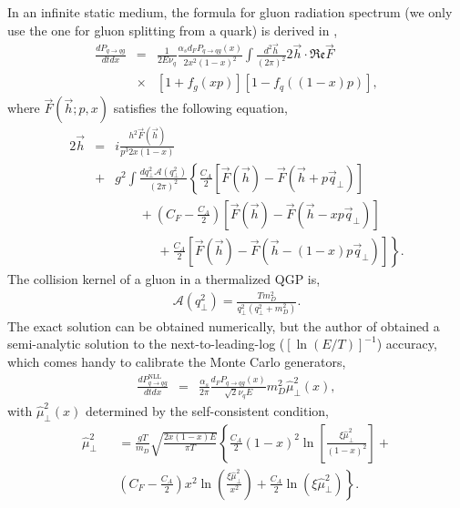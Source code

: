 \documentclass[aps, prc, reprint, amsmath, groupedaddress, nofootinbib]{revtex4-1}
\begin{document}
In an infinite static medium, the formula for gluon radiation spectrum (we only use the one for gluon splitting from a quark) is derived in \cite{Arnold:2002zm,Arnold:2003zc},
\begin{eqnarray}\label{eq:AMY-1}
\nonumber
\frac{dP_{q\rightarrow qg}}{dt dx} &=& \frac{1}{2E\nu_q} \frac{\alpha_s d_F P_{q\rightarrow qg}(x)}{2x^2(1-x)^2}\int\frac{d^2\vec{h}}{(2\pi)^2}2\vec{h}\cdot \mathfrak{Re} \vec{F} \\
&\times& [1+f_g(xp)][1-f_q((1-x)p)],
\end{eqnarray}
where $\vec{F}(\vec{h}; p, x)$ satisfies the following equation,
\begin{eqnarray}\label{eq:AMY-2}
\nonumber
2\vec{h} &=& i\frac{h^2 \vec{F}(\vec{h})}{p^3 2x(1-x)} \\
\nonumber
&+& g^2\int \frac{dq_\perp^2 \mathcal{A}(q_\perp^2)}{(2\pi)^2}\left\{\frac{C_A}{2}\left[\vec{F}(\vec{h}) - \vec{F}(\vec{h}+p\vec{q}_\perp)\right]\right. \\
\nonumber
&& \phantom{ssss} + \left(C_F - \frac{C_A}{2}\right)\left[\vec{F}(\vec{h}) - \vec{F}(\vec{h}-xp\vec{q}_\perp)\right] \\
&& \phantom{sssssss} + \left. \frac{C_A}{2}\left[\vec{F}(\vec{h}) - \vec{F}(\vec{h}-(1-x)p\vec{q}_\perp)\right] \right\}.
\end{eqnarray}
The collision kernel of a gluon in a thermalized QGP is,
\begin{eqnarray}
\mathcal{A}(q_\perp^2) = \frac{T m_D^2}{q_\perp^2(q_\perp^2+m_D^2)}.
\end{eqnarray}
The exact solution can be obtained numerically, but the author of \cite{Arnold:2008zu} obtained a semi-analytic solution to the next-to-leading-log ($[\ln(E/T)]^{-1}$) accuracy, which comes handy to calibrate the Monte Carlo generators,
\begin{eqnarray}\label{eq:AMY-NLL}
\frac{dP_{q\rightarrow qg}^{\textrm{NLL}}}{dt dx} &=& \frac{\alpha_s}{2\pi}\frac{ d_F P_{q\rightarrow qg}(x)}{\sqrt{2}\nu_q E} m_D^2 \hat{\mu}_\perp^2(x),
\end{eqnarray}
with $\hat{\mu}_\perp^2(x)$ determined by the self-consistent condition,
\begin{eqnarray}\label{eq:AMY-sf}
\nonumber
\hat{\mu}_\perp^2 && = \frac{gT}{m_D} \sqrt{\frac{2x(1-x)E}{\pi T}}\left\{
\frac{C_A}{2}(1-x)^2\ln\left[\frac{\xi\hat{\mu}_\perp^2}{(1-x)^2}\right] + \right. \\
&&\left.\left(C_F-\frac{C_A}{2}\right)x^2\ln\left(\frac{\xi\hat{\mu}_\perp^2}{x^2}\right) + \frac{C_A}{2}\ln(\xi\hat{\mu}_\perp^2)\right\}.
\end{eqnarray}
\end{document}
